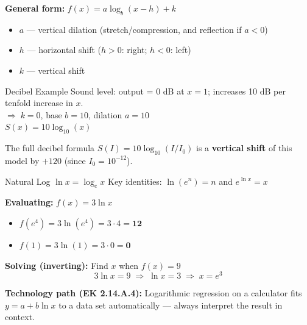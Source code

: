 \documentclass[aspectratio=169, 11pt]{beamer}
\begin{document}
\begin{frame}[t, plain]

  \vspace{0.3cm}
  \textbf{General form:} $f(x) = a\log_b(x - h) + k$

  \vspace{0.2cm}
  \begin{itemize}
    \setlength{\itemsep}{6pt}
    \item $a$ --- vertical dilation (stretch/compression, and reflection if $a < 0$)
    \item $h$ --- horizontal shift ($h > 0$: right; $h < 0$: left)
    \item $k$ --- vertical shift
  \end{itemize}

  \vspace{0.3cm}
  \begin{block}{Decibel Example}
    Sound level: output = 0 dB at $x = 1$; increases 10 dB per tenfold increase in $x$.\\[6pt]
    $\Rightarrow\; k = 0$, base $b = 10$, dilation $a = 10$\\[4pt]
    $S(x) = 10\log_{10}(x)$
  \end{block}

  \vspace{0.2cm}
  The full decibel formula $S(I) = 10\log_{10}(I/I_0)$ is a \textbf{vertical shift}
  of this model by $+120$ (since $I_0 = 10^{-12}$).
\end{frame}

\begin{frame}[t, plain]

  \vspace{0.3cm}
  \begin{block}{Natural Log}
    $\ln x = \log_e x$ \qquad Key identities: $\ln(e^n) = n$ \quad and \quad $e^{\ln x} = x$
  \end{block}

  \vspace{0.3cm}
  \textbf{Evaluating:} $f(x) = 3\ln x$

  \vspace{0.1cm}
  \begin{itemize}
    \setlength{\itemsep}{6pt}
    \item $f(e^4) = 3\ln(e^4) = 3 \cdot 4 = \mathbf{12}$
    \item $f(1) = 3\ln(1) = 3 \cdot 0 = \mathbf{0}$
  \end{itemize}

  \vspace{0.3cm}
  \textbf{Solving (inverting):} Find $x$ when $f(x) = 9$
  \[
    3\ln x = 9 \;\Rightarrow\; \ln x = 3 \;\Rightarrow\; x = e^3
  \]

  \vspace{0.2cm}
  \textbf{Technology path (EK 2.14.A.4):} Logarithmic regression on a calculator fits
  $y = a + b\ln x$ to a data set automatically --- always interpret the result in context.
\end{frame}
\end{document}
